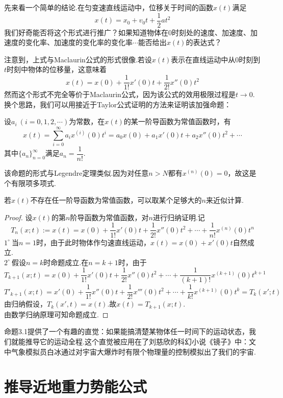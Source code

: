 先来看一个简单的结论.在匀变速直线运动中，位移关于时间的函数$x(t)$满足$$x(t) = x_0 + v_0t + \frac{1}{2}at^2$$
我们好奇能否将这个形式进行推广？如果知道物体在$0$时刻处的速度、加速度、加速度的变化率、加速度的变化率的变化率$\cdots$能否给出$x(t)$的表达式？

注意到，上式与Maclaurin公式的形式很像.若设$x(t)$表示在直线运动中从$0$时刻到$t$时刻中物体的位移量，这意味着$$x(t) = x(0) + \frac{1}{1!} x'(0)t + \frac{1}{2!} x''(0)t^2$$
然而这个形式不完全等价于Maclaurin公式，因为该公式的效用极限过程是$t \to 0$.换个思路，我们可以用接近于Taylor公式证明的方法来证明该加强命题：

\begin{proposition}{}
	设$a_i~(i=0,1,2,\cdots)$为常数，在$x(t)$的某一阶导函数为常值函数时，有$$x(t) = \sum_{i=0}^{\infty} a_ix^{(i)}(0) t^{i} = a_0x(0) + a_1x'(0)t + a_2x''(0)t^2 + \cdots$$
	其中$\{ a_n \}_{n=0}^{\infty}$满足$a_n = \dfrac{1}{n!}$.
\end{proposition}
\begin{remark}
	该命题的形式与Legendre定理类似.因为对任意$n>N$都有$x^{(n)}(0)=0$，故这是个有限项多项式.
\end{remark}
\begin{remark}
	若$x(t)$不存在任一阶导函数为常值函数，可以取某个足够大的$n$来近似计算.
\end{remark}
\begin{proof}
	设$x(t)$的第$n$阶导函数为常值函数，对$n$进行归纳证明.记$$T_n(x;t) := x(t) = x(0) + \frac{1}{1!} x'(0)t + \frac{1}{2!} x''(0)t^2 + \cdots + \frac{1}{n!} x^{(n)}(0)t^n$$
	$1^{\circ}~$当$n=1$时，由于此时物体作匀速直线运动，$x(t)=x(0)+x'(0)t$自然成立. \\
	$2^{\circ}~$假设$n=k$时命题成立.在$n=k+1$时，由于
	$$T_{k+1}(x;t) = x(0) + \frac{1}{1!} x'(0)t + \frac{1}{2!} x''(0)t^2 + \cdots + \frac{1}{(k+1)!} x^{(k+1)}(0)t^{k+1}$$
	$$T'_{k+1}(x;t) = x'(0) + \frac{1}{1!} x''(0)t + \frac{1}{2!} x'''(0)t^2 + \cdots + \frac{1}{k!} x^{(k+1)}(0)t^k = T_{k}(x';t)$$
	由归纳假设，$T_k(x',t)=x(t)$.故$x(t)=T_{k+1}(x;t)$. \\
	由数学归纳原理可知命题成立.
\end{proof}

命题3.1提供了一个有趣的直觉：如果能搞清楚某物体任一时间下的运动状态，我们就能推导它的运动全程.这个直觉被应用在了刘慈欣的科幻小说《镜子》\cite{liucixin}中：文中气象模拟员白冰通过对宇宙大爆炸时有限个物理量的控制模拟出了我们的宇宙.

\section{推导近地重力势能公式}

